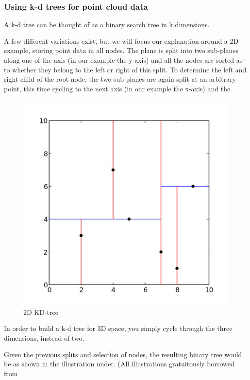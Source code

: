 \subsubsection{Using k-d trees for point cloud data} %
\label{ssub:using_k_d_trees_for_point_cloud_data}

A k-d tree can be thought of as a binary search tree in k dimensions.

A few different variations exist, but we will focus our explanation around a 2D example, storing point data in all nodes. The plane is split into two sub-planes along one of the axis (in our example the y-axis) and all the nodes are sorted as to whether they belong to the left or right of this split. To determine the left and right child of the root node, the two sub-planes are again split at an arbitrary point, this time cycling to the next axis (in our example the x-axis) and the

\begin{figure}[ht!]
\centering
\includegraphics[width=120mm]{../gfx/Kdtree_2d.png}

\caption{2D KD-tree}
\label{fig:kdtree_2d}
\end{figure}

In order to build a k-d tree for 3D space, you simply cycle through the three dimensions, instead of two.

Given the previous splits and selection of nodes, the resulting binary tree would be as shown in the illustration under. (All illustrations gratuitously borrowed from

